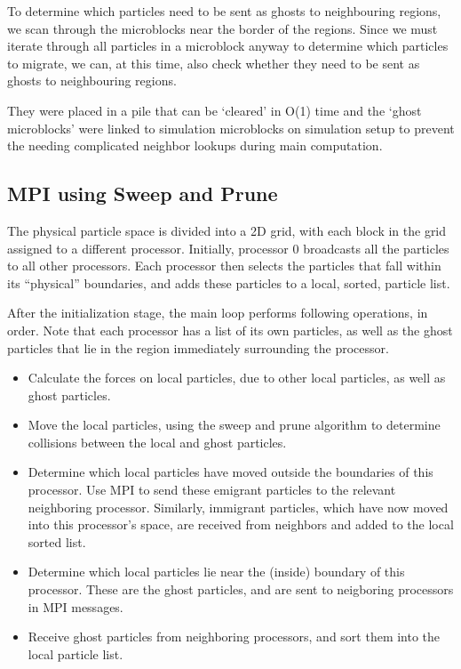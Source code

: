 \documentclass[11pt]{article} %
\begin{document}
To determine which particles need to be sent as ghosts to neighbouring regions, we scan through the microblocks near the border of the regions. Since we must iterate through all particles in a microblock anyway to determine which particles to migrate, we can, at this time, also check whether they need to be sent as ghosts to neighbouring regions. 

They were placed in a pile that can be `cleared' in O(1) time and the `ghost microblocks' were linked to simulation microblocks on simulation setup to prevent the needing complicated neighbor lookups during main computation.

\subsection{MPI using Sweep and Prune}

The physical particle space is divided into a 2D grid, with each block in the grid assigned to a different processor. Initially, processor 0 broadcasts all the particles to all other processors. Each processor then selects the particles that fall within its ``physical'' boundaries, and adds these particles to a local, sorted, particle list.

After the initialization stage, the main loop performs following operations, in order. Note that each processor has a list of its own particles, as well as the ghost particles that lie in the region immediately surrounding the processor.
\begin{itemize}
\item Calculate the forces on local particles, due to other local particles, as well as ghost particles.
\item Move the local particles, using the sweep and prune algorithm to determine collisions between the local and ghost particles.
\item Determine which local particles have moved outside the boundaries of this processor. Use MPI to send these emigrant particles to the relevant neighboring processor. Similarly, immigrant particles, which have now moved into this processor's space, are received from neighbors and added to the local sorted list.
\item Determine which local particles lie near the (inside) boundary of this processor. These are the ghost particles, and are sent to neigboring processors in MPI messages.
\item Receive ghost particles from neighboring processors, and sort them into the local particle list.
\end{itemize}
\end{document}
